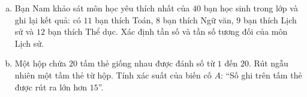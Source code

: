\begin{bt}%
\begin{enumerate}[a)]
		\item Bạn Nam khảo sát môn học yêu thích nhất của $40$ bạn học sinh trong lớp và ghi lại kết quả: có $11$ bạn thích Toán, $8$ bạn thích Ngữ văn, $9$ bạn thích Lịch sử và $12$ bạn thích Thể dục. Xác định tần số và tần số tương đối của môn Lịch sử.
		\item Một hộp chứa $20$ tấm thẻ giống nhau được đánh số từ $1$ đến $20$. Rút ngẫu nhiên một tấm thẻ từ hộp. Tính xác suất của biến cố $A$: ``Số ghi trên tấm thẻ được rút ra lớn hơn $15$''.
	\end{enumerate}
\end{bt}


